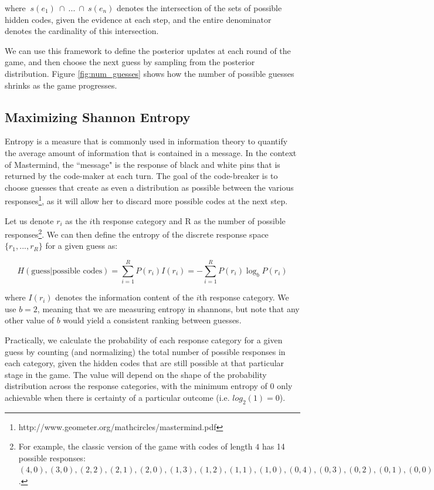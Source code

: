 \documentclass[11pt]{article}
\begin{document}
\noindent where $\ s(e_1) \ \cap \ ... \ \cap \ s(e_n)$ denotes the intersection of the sets of possible hidden codes, given the evidence at each step, and the entire denominator denotes the cardinality of this intersection.

We can use this framework to define the posterior updates at each round of the game, and then choose the next guess by sampling from the posterior distribution. Figure \ref{fig:num_guesses} shows how the number of possible guesses shrinks as the game progresses.

\subsection{Maximizing Shannon Entropy}

Entropy is a measure that is commonly used in information theory to quantify the average amount of information that is contained in a message. In the context of Mastermind, the ``message" is the response of black and white pins that is returned by the code-maker at each turn. The goal of the code-breaker is to choose guesses that create as even a distribution as possible between the various responses\footnote{http://www.geometer.org/mathcircles/mastermind.pdf}, as it will allow her to discard more possible codes at the next step.

Let us denote $r_i$ as the $i$th response category and R as the number of possible responses\footnote{For example, the classic version of the game with codes of length $4$ has 14 possible responses: $(4, 0), (3, 0), (2, 2), (2, 1), (2, 0), (1, 3), (1, 2), (1, 1), (1, 0), (0, 4), (0, 3), (0, 2), (0, 1), (0, 0)$.}. We can then define the entropy of the discrete response space $\{r_1, ... , r_R\}$ for a given guess as:

\[
H(\text{guess} | \text{possible codes}) = \sum_{i=1}^R P(r_i) I(r_i) = - \sum_{i=1}^R P(r_i) \log_bP(r_i)
\]

\noindent where $I(r_i)$ denotes the information content of the $i$th response category. We use $b=2$, meaning that we are measuring entropy in shannons, but note that any other value of $b$ would yield a consistent ranking between guesses.

Practically, we calculate the probability of each response category for a given guess by counting (and normalizing) the total number of possible responses in each category, given the hidden codes that are still possible at that particular stage in the game. The value will depend on the shape of the probability distribution across the response categories, with the minimum entropy of $0$ only achievable when there is certainty of a particular outcome (i.e. $log_2(1)=0$).
\end{document}
